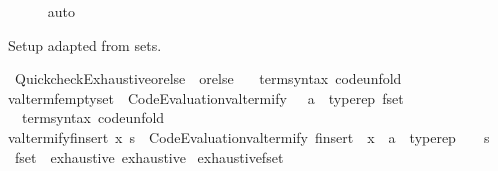 \begin{isabellebody}
\ \ \ \ \isamarkupfalse%
\ auto\isanewline
{}\isamarkupfalse%
%
\endisatagproof
{\isafoldproof}%
%
\isadelimproof
%
\endisadelimproof
%
\isadelimdocument
%
\endisadelimdocument
%
\isatagdocument
%
\isamarkuptrue%
%
\endisatagdocument
{\isafolddocument}%
%
\isadelimdocument
%
\endisadelimdocument
%
\begin{isamarkuptext}%
Setup adapted from sets.%
\end{isamarkuptext}\isamarkuptrue%
\isamarkupfalse%
\ Quickcheck{\isacharunderscore}Exhaustive{\isachardot}orelse\ {\isacharparenleft}\ {\isachardoublequoteopen}orelse{\isachardoublequoteclose}\ {}{}{\isacharparenright}\isanewline
\isanewline
{}\isamarkupfalse%
\ {\isacharparenleft}\ term{\isacharunderscore}syntax{\isacharparenright}\ {\isacharbrackleft}code{\isacharunderscore}unfold{\isacharbrackright}{\isacharcolon}\isanewline
{\isachardoublequoteopen}valterm{\isacharunderscore}femptyset\ {\isacharequal}\ Code{\isacharunderscore}Evaluation{\isachardot}valtermify\ {\isacharparenleft}{\isacharbraceleft}{\isacharbar}{\isacharbar}{\isacharbraceright}\ {\isacharcolon}{\isacharcolon}\ {\isacharparenleft}{\isacharprime}a\ {\isacharcolon}{\isacharcolon}\ typerep{\isacharparenright}\ fset{\isacharparenright}{\isachardoublequoteclose}\isanewline
\isanewline
{}\isamarkupfalse%
\ {\isacharparenleft}\ term{\isacharunderscore}syntax{\isacharparenright}\ {\isacharbrackleft}code{\isacharunderscore}unfold{\isacharbrackright}{\isacharcolon}\isanewline
{\isachardoublequoteopen}valtermify{\isacharunderscore}finsert\ x\ s\ {\isacharequal}\ Code{\isacharunderscore}Evaluation{\isachardot}valtermify\ finsert\ {\isacharbraceleft}{\isasymcdot}{\isacharbraceright}\ {\isacharparenleft}x\ {\isacharcolon}{\isacharcolon}\ {\isacharparenleft}{\isacharprime}a\ {\isacharcolon}{\isacharcolon}\ typerep\ {\isacharasterisk}\ {\isacharunderscore}{\isacharparenright}{\isacharparenright}\ {\isacharbraceleft}{\isasymcdot}{\isacharbraceright}\ s{\isachardoublequoteclose}\isanewline
\isanewline
{}\isamarkupfalse%
\ fset\ {\isacharcolon}{\isacharcolon}\ {\isacharparenleft}exhaustive{\isacharparenright}\ exhaustive\isanewline
{}\isanewline
\isanewline
{}\isamarkupfalse%
\ exhaustive{\isacharunderscore}fset\ \isanewline

\end{isabellebody}
